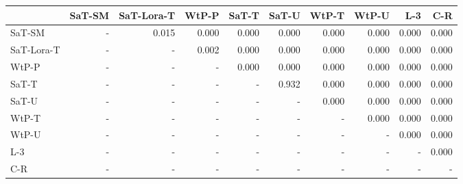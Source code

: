 \begin{tabular}{lrrrrrrrrr}
\toprule
 & SaT-SM & SaT-Lora-T & WtP-P & SaT-T & SaT-U & WtP-T & WtP-U & L-3 & C-R \\
\midrule
SaT-SM & - & 0.015 & 0.000 & 0.000 & 0.000 & 0.000 & 0.000 & 0.000 & 0.000 \\
SaT-Lora-T & - & - & 0.002 & 0.000 & 0.000 & 0.000 & 0.000 & 0.000 & 0.000 \\
WtP-P & - & - & - & 0.000 & 0.000 & 0.000 & 0.000 & 0.000 & 0.000 \\
SaT-T & - & - & - & - & 0.932 & 0.000 & 0.000 & 0.000 & 0.000 \\
SaT-U & - & - & - & - & - & 0.000 & 0.000 & 0.000 & 0.000 \\
WtP-T & - & - & - & - & - & - & 0.000 & 0.000 & 0.000 \\
WtP-U & - & - & - & - & - & - & - & 0.000 & 0.000 \\
L-3 & - & - & - & - & - & - & - & - & 0.000 \\
C-R & - & - & - & - & - & - & - & - & - \\
\bottomrule
\end{tabular}

